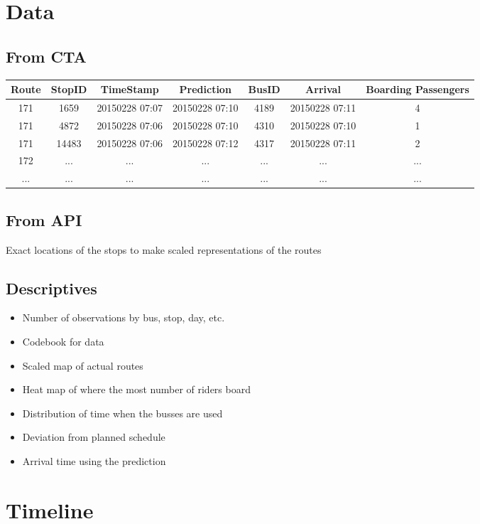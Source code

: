 \documentclass{article}
\begin{document}
\section{Data}

\subsection{From CTA}

\begin{table}[h]
\begin{center}
\begin{tabular}{ c | c | c | c | c | c | c }
Route & StopID & TimeStamp & Prediction & BusID & Arrival & Boarding Passengers \\
\hline
171 & 1659 & 20150228 07:07 & 20150228 07:10 & 4189 & 20150228 07:11 & 4 \\
171 & 4872 & 20150228 07:06 & 20150228 07:10 & 4310 & 20150228 07:10 & 1 \\
171 &14483 & 20150228 07:06	& 20150228 07:12 & 4317 & 20150228 07:11 & 2 \\
172 & ... & ... & ... & ... & ... & ... \\
...  & ... & ... & ... & ... & ... & ... 
\end{tabular}
\end{center}
\end{table}

\subsection{From API}

Exact locations of the stops to make scaled representations of the routes

\subsection{Descriptives}

\begin{itemize}
	\item Number of observations by bus, stop, day, etc.
	\item Codebook for data
	\item Scaled map of actual routes
	\item Heat map of where the most number of riders board
	\item Distribution of time when the busses are used
	\item Deviation from planned schedule
	\item Arrival time using the prediction
\end{itemize}

\section{Timeline}
\end{document}
